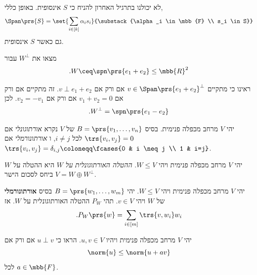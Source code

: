 \documentclass[a4paper,10pt,twoside,openany]{book}
\begin{document}
\begin{remark}
לא יכולנו בתרגיל האחרון להניח כי
$S$
אינסופית. באופן כללי,
\[\Span\prs{S} = \set{\sum_{i \in [k]} \alpha_i s_i}{\substack{\alpha_i \in \mbb{F} \\ s_i \in S}}\]
גם כאשר
$S$
אינסופית.
\end{remark}

\begin{exercisechap}
מצאו את
$W^\perp$
עבור
\[\text{.} W \ceq \spn\prs{e_1 + e_2} \leq \mbb{R}^2\]
\end{exercisechap}

\begin{solution}
ראינו כי מתקיים
$v \in \Span\prs{e_1 + e_2}^\perp$
אם ורק אם
$v \perp e_1 + e_2$.
זה מתקיים
אם ורק אם
$v_1 + v_2 = 0$
אם ורק אם
$v_2 = - v_1$.
לכן
\[\text{.} W^\perp = \spn\prs{e_1 - e_2}\]
\end{solution}

\begin{definition}
יהי
$V$
מרחב מכפלה פנימית.
בסיס
$B = \prs{v_1, \ldots, v_n}$
של
$V$
נקרא
\emph{אורתוגונלי}
אם
$\trs{v_i, v_j} = 0$
לכל
$i \neq j$,
ו%
\emph{אורתונורמלי}
אם
$\trs{v_i, v_j} = \delta_{i,j} \coloneqq \fcases{0 & i \neq j \\ 1 & i=j}$.
\end{definition}

\begin{definition}
יהי
$V$
מרחב מכפלה פנימית ויהי
$W \leq V$.
\emph{ההטלה האורתוגונלית על
$W$}
היא ההטלה על
$W$
ביחס לסכום הישר
$V = W \oplus W^\perp$.
\end{definition}

\begin{proposition}
יהי
$V$
מרחב מכפלה פנימית ויהי
$W \leq V$.
יהי
$B = \prs{w_1, \ldots, w_m}$
בסיס
\textbf{אורתונורמלי}
של
$W$
ויהי
$v \in V$.
תהי
$P_W$
ההטלה האורתוגונלית על
$W$.
אז
\[\text{.} P_W\prs{w} = \sum_{i \in [m]} \trs{v, w_i} w_i\]
\end{proposition}

\begin{exercisechap}
יהי
$V$
מרחב מכפלה פנימית ויהיו
$u,v \in V$.
הראו כי
$u \perp v$
אם ורק אם
\[\norm{u} \leq \norm{u+av}\]
לכל
$a \in \mbb{F}$.
\end{exercisechap}
\end{document}
